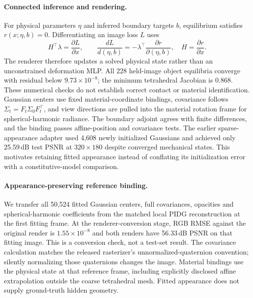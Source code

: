 \paragraph{Connected inference and rendering.}
For physical parameters $\eta$ and inferred boundary targets $b$, equilibrium satisfies $r(x;\eta,b)=0$. Differentiating an image loss $L$ uses
\begin{equation}
 H^\top\lambda=\frac{\partial L}{\partial x},\qquad
 \frac{dL}{d(\eta,b)}=-\lambda^\top\frac{\partial r}{\partial(\eta,b)},\quad H=\frac{\partial r}{\partial x}.
\end{equation}
The renderer therefore updates a solved physical state rather than an unconstrained deformation MLP. All 228 held-image object equilibria converge with residual below $9.73\times10^{-8}$; the minimum tetrahedral Jacobian is 0.868. These numerical checks do not establish correct contact or material identification. Gaussian centers use fixed material-coordinate bindings, covariance follows $\Sigma_t=F_t\Sigma_0F_t^\top$, and view directions are pulled into the material rotation frame for spherical-harmonic radiance. The boundary adjoint agrees with finite differences, and the binding passes affine-position and covariance tests. The earlier sparse-appearance adapter used 4,608 newly initialized Gaussians and achieved only 25.59\,dB test PSNR at $320\times180$ despite converged mechanical states. This motivates retaining fitted appearance instead of conflating its initialization error with a constitutive-model comparison.

\paragraph{Appearance-preserving reference binding.}
We transfer all 50,524 fitted Gaussian centers, full covariances, opacities and spherical-harmonic coefficients from the matched local PIDG reconstruction at the first fitting frame. At the renderer-conversion stage, RGB RMSE against the original render is $1.55\times10^{-8}$ and both renders have 56.33\,dB PSNR on that fitting image. This is a conversion check, not a test-set result. The covariance calculation matches the released rasterizer's unnormalized-quaternion convention; silently normalizing those quaternions changes the image. Material bindings use the physical state at that reference frame, including explicitly disclosed affine extrapolation outside the coarse tetrahedral mesh. Fitted appearance does not supply ground-truth hidden geometry.

